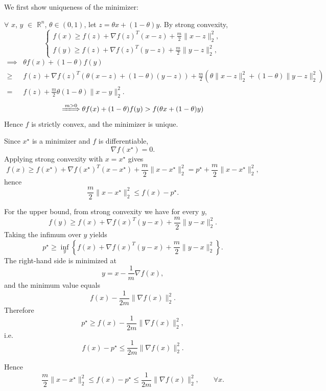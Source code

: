 \documentclass[11pt,letter,notitlepage]{article}
\theoremstyle{definition}
\begin{document}
\begin{solution}
\begin{enumerate}[label=(\alph*)]
    We first show uniqueness of the minimizer:
    
    $\forall$ $x$, $y$ $\in$ $\mathbb{R}^n$, $\theta\in (0,1)$, let $z=\theta x + (1-\theta)y$. By strong convexity,
    \[
    \left\{
    \begin{aligned}
    f(x) \geq f(z) + \nabla f(z)^T(x-z) + \frac{m}{2}\|x-z\|_2^2,\\
    f(y) \geq f(z) + \nabla f(z)^T(y-z) + \frac{m}{2}\|y-z\|_2^2,
    \end{aligned}
    \right.
    \]
    \[
    \begin{aligned}
    \implies
    &\theta f(x) + (1-\theta) f(y)\\
    \geq
    &f(z) + \nabla f(z)^{T} (\theta(x-z) + (1-\theta)(y-z)) + \frac{m}{2} \left( \theta \|x-z\|_2^2 + (1-\theta) \|y-z\|_2^2 \right)\\
    =
    &f(z) + \frac{m}{2}\theta(1-\theta)\|x-y\|_2^2.
    \end{aligned}
    \]
    \[
    \xLongrightarrow{m > 0}
    \theta f(x) + (1-\theta) f(y) > f(\theta x + (1-\theta) y)
    \]
    Hence $f$ is strictly convex, and the minimizer is unique.

    Since $x^\star$ is a minimizer and $f$ is differentiable,
    \[
    \nabla f(x^\star)=0.
    \]
    Applying strong convexity with $x=x^\star$ gives
    \[
    f(x)\ge f(x^\star)+\nabla f(x^\star)^T(x-x^\star)+\frac{m}{2}\|x-x^\star\|_2^2
    =p^\star+\frac{m}{2}\|x-x^\star\|_2^2,
    \]
    hence
    \[
    \frac{m}{2}\|x-x^\star\|_2^2\le f(x)-p^\star.
    \]

    For the upper bound, from strong convexity we have for every $y$,
    \[
    f(y)\ge f(x)+\nabla f(x)^T(y-x)+\frac{m}{2}\|y-x\|_2^2.
    \]
    Taking the infimum over $y$ yields
    \[
    p^\star\ge \inf_y \left\{ f(x)+\nabla f(x)^T(y-x)+\frac{m}{2}\|y-x\|_2^2 \right\}.
    \]
    The right-hand side is minimized at
    \[
    y=x-\frac1m\nabla f(x),
    \]
    and the minimum value equals
    \[
    f(x)-\frac1{2m}\|\nabla f(x)\|_2^2.
    \]
    Therefore
    \[
    p^\star\ge f(x)-\frac1{2m}\|\nabla f(x)\|_2^2,
    \]
    i.e.
    \[
    f(x)-p^\star\le \frac1{2m}\|\nabla f(x)\|_2^2.
    \]

    Hence
    \[
    \frac{m}{2}\|x-x^\star\|_2^2 \le f(x)-p^\star \le \frac{1}{2m}\|\nabla f(x)\|_2^2,
    \qquad \forall x.
    \]


\end{enumerate}
\end{solution}
\end{document}
